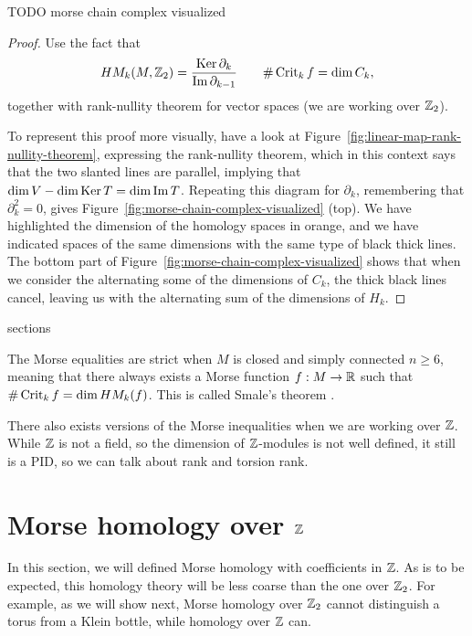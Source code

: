 \begin{marginfigure}
    \centering
    \caption{TODO morse chain complex visualized}
    \label{fig:morse-chain-complex-visualized}
\end{marginfigure}
\begin{proof}
    Use the fact that 
    \[
        \HMf[k]{M, \Z_2} = \frac{\Ker \partial_k}{\Im \partial_{k-1}} \qquad \# \Crit_k f = \dim C_k,
    \]
    together with rank-nullity theorem for vector spaces (we are working over $\Z_2$).

    To represent this proof more visually, have a look at Figure~\ref{fig:linear-map-rank-nullity-theorem}, expressing the rank-nullity theorem, which in this context says that the two slanted lines are parallel, implying that $\dim V - \dim \Ker T = \dim \Im T$.
    Repeating this diagram for $\partial_k$, remembering that  $\partial_k^2 = 0$, gives Figure~\ref{fig:morse-chain-complex-visualized} (top). We have highlighted the dimension of the homology spaces in orange, and we have indicated spaces of the same dimensions with the same type of black thick lines.
    The bottom part of Figure~\ref{fig:morse-chain-complex-visualized} shows that when we consider the alternating some of the dimensions of $C_k$, the thick black lines cancel, leaving us with the alternating sum of the dimensions of $H_k$.
\end{proof}



sections

\begin{remark}
    The Morse equalities are strict when $M$ is closed and simply connected $n\ge 6$, meaning that there always exists a Morse function $f: M \to  \R$ such that $\# \Crit_k f = \dim \HMf[k]f$. This is called Smale's theorem \cite[p.~392]{smale2007generalized}.
\end{remark}
\begin{remark}
    There also exists versions of the Morse inequalities when we are working over $\Z$. While $\Z$ is not a field,
    so the dimension of $\Z$-modules is not well defined, it still is a PID, so we can talk about rank and torsion rank.
\end{remark}


\section{Morse homology over $\Z$}
In this section, we will defined Morse homology with coefficients in $\Z$.
As is to be expected, this homology theory will be less coarse than the one over $\Z_2$. For example, as we will show next, Morse homology over $\Z_2$ cannot distinguish a torus from a Klein bottle, while homology over $\Z$ can.

